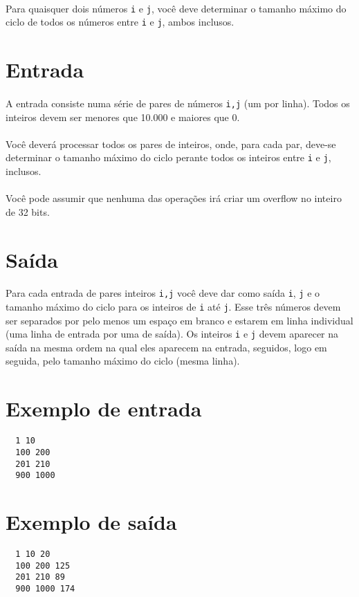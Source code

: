 \documentclass{article}
\begin{document}
\paragraph{}
Para quaisquer dois números \verb|i| e \verb|j|, você deve determinar o tamanho máximo do ciclo de todos os números
entre \verb|i| e \verb|j|, ambos inclusos.

\section*{Entrada}
\paragraph{}
A entrada consiste numa série de pares de números \verb|i,j| (um por linha). Todos os inteiros devem ser menores
que 10.000 e maiores que 0.
\paragraph{}
Você deverá processar todos os pares de inteiros, onde, para cada par, deve-se determinar o tamanho máximo do ciclo
perante todos os inteiros entre \verb|i| e \verb|j|, inclusos.
\paragraph{}
Você pode assumir que nenhuma das operações irá criar um overflow no inteiro de 32 bits.

\section*{Saída}
\paragraph{}
Para cada entrada de pares inteiros \verb|i,j| você deve dar como saída \verb|i|, \verb|j| e o tamanho máximo do ciclo para
os inteiros de \verb|i| até \verb|j|. Esse três números devem ser separados por pelo menos um espaço em branco e
estarem em linha individual (uma linha de entrada por uma de saída). Os inteiros \verb|i| e \verb|j| devem aparecer
na saída na mesma ordem na qual eles aparecem na entrada, seguidos, logo em seguida, pelo tamanho máximo do ciclo (mesma linha).

\section*{Exemplo de entrada}
\begin{BVerbatim}
  1 10
  100 200
  201 210
  900 1000
\end{BVerbatim}

\section*{Exemplo de saída}
\begin{BVerbatim}
  1 10 20
  100 200 125
  201 210 89
  900 1000 174
\end{BVerbatim}
\end{document}
